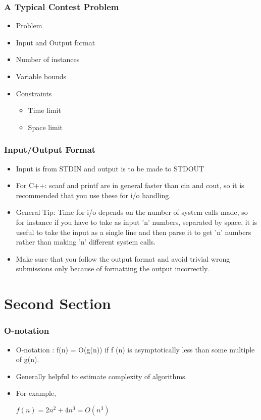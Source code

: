 \documentclass{beamer}
\begin{document}
\begin{frame}
\frametitle{A Typical Contest Problem}
\begin{itemize}

\item Problem
\item Input and Output format
\item Number of instances
\item Variable bounds
\item Constraints
\begin{itemize}
\item Time limit
\item Space limit
\end{itemize}
\end{itemize}
\end{frame}


\begin{frame}
\frametitle{Input/Output Format}
\begin{itemize}
\item Input is from STDIN and output is to be made to STDOUT
\item For C++: scanf and printf are in general faster than cin and cout, so it is recommended that you use these for i/o handling.
\item General Tip: Time for i/o depends on the number of system calls made, so for instance if you have to take as input 'n' numbers, separated by space, it is useful to take the input as a single line and then parse it to get 'n' numbers rather than making 'n' different system calls.
\item Make sure that you follow the output format and avoid trivial wrong submissions only because of formatting the output incorrectly.
\end{itemize}
\end{frame}

\section{Second Section}

\begin{frame}
\frametitle{O-notation}
\begin{itemize}
\item O-notation : \newline
f(n) = O(g(n)) if f (n) is asymptotically less than some
multiple of g(n).
\item Generally helpful to estimate complexity of algorithms.
\item For example,

$f(n) = 2n^2 + 4n^3 = O(n^3)$
\end{itemize}
\end{frame}
\end{document}
